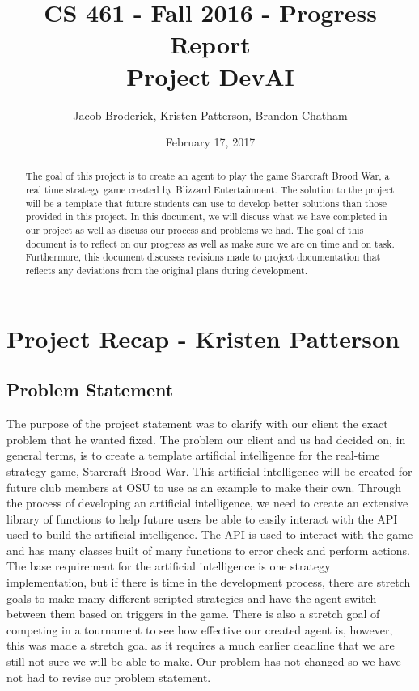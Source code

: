 \documentclass[10pt,letterpaper,onecolumn,draftclsnofoot]{IEEEtran}
\begin{document}
	
	\begin{titlepage}
		
		\title{CS 461 - Fall 2016 - Progress Report \\ Project DevAI}
		\author{Jacob Broderick, Kristen Patterson, Brandon Chatham}
		\date{February 17, 2017}
		\maketitle
		\vspace{4cm}
		\begin{abstract}
			\noindent 
			\noindent
			The goal of this project is to create an agent to play the game Starcraft Brood War, a real time strategy game created by Blizzard Entertainment. The solution to the project will be a template that future students can use to develop better solutions than those provided in this project. In this document, we will discuss what we have completed in our project as well as discuss our process and problems we had. The goal of this document is to reflect on our progress as well as make sure we are on time and on task. Furthermore, this document discusses revisions made to project documentation that reflects any deviations from the original plans during development.
		\end{abstract}
	\end{titlepage}

	\section{Project Recap - Kristen Patterson}

	\subsection{Problem Statement}
	The purpose of the project statement was to clarify with our client the exact problem that he wanted fixed. The problem our client and us had decided on, in general terms, is to create a template artificial intelligence for the real-time strategy game, Starcraft Brood War. This artificial intelligence will be created for future club members at OSU to use as an example to make their own. Through the process of developing an artificial intelligence, we need to create an extensive library of functions to help future users be able to easily interact with the API used to build the artificial intelligence. The API is used to interact with the game and has many classes built of many functions to error check and perform actions. The base requirement for the artificial intelligence is one strategy implementation, but if there is time in the development process, there are stretch goals to make many different scripted strategies and have the agent switch between them based on triggers in the game. There is also a stretch goal of competing in a tournament to see how effective our created agent is, however, this was made a stretch goal as it requires a much earlier deadline that we are still not sure we will be able to make. Our problem has not changed so we have not had to revise our problem statement.
\end{document}
